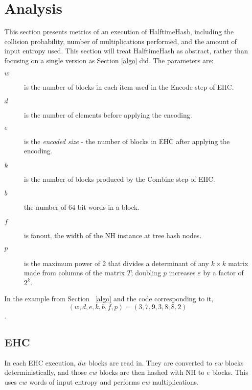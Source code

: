 \documentclass[runningheads]{llncs}
\begin{document}
\section{Analysis}
\label{analysis}

This section presents metrics of an execution of HalftimeHash, including the collision probability, number of multiplications performed, and the amount of input entropy used.
This section will treat HalftimeHash as abstract, rather than focusing on a single version as Section \ref{algo} did.
The parameters are:

\begin {description}
\item[$w$] is the number of blocks in each item used in the Encode step of EHC.
\item[$d$] is the number of elements before applying the encoding.
\item[$e$] is the {\em encoded size} - the number of blocks in EHC after applying the encoding.
\item[$k$] is the number of blocks produced by the Combine step of EHC.
\item[$b$] the number of 64-bit words in a block.
\item[$f$] is fanout, the width of the NH instance at tree hash nodes.
\item[$p$] is the maximum power of 2 that divides a determinant of any $k \times k$ matrix made from columns of the matrix $T$; doubling $p$ increases $\varepsilon$ by a factor of $2^k$.
\end{description}

In the example from Section ~\ref{algo} and the code corresponding to it, \[(w, d, e, k, b, f, p) = (3, 7, 9, 3, 8, 8, 2)\].

\subsection{EHC}

In each EHC execution, $d w$ blocks are read in.
They are converted to $e w$ blocks deterministically, and those $e w$ blocks are then hashed with NH to $e$ blocks.
This uses $e w$ words of input entropy and performs $e w$ multiplications.


\end{document}
